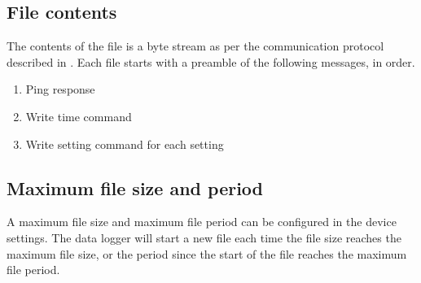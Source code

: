 \subsection{File contents}

The contents of the file is a byte stream as per the communication protocol described in .  Each file starts with a preamble of the following messages, in order.

\begin{enumerate}[nolistsep]
    \item Ping response
    \item Write time command
    \item Write setting command for each setting
\end{enumerate}

\subsection{Maximum file size and period}
\label{sec:maximumFileSizeAndPeriod}

A maximum file size and maximum file period can be configured in the device settings.  The data logger will start a new file each time the file size reaches the maximum file size, or the period since the start of the file reaches the maximum file period.
